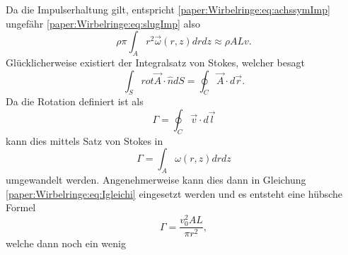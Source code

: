 Da die Impulserhaltung gilt, entspricht \ref{paper:Wirbelringe:eq:achssymImp} ungefähr \ref{paper:Wirbelringe:eq:slugImp} also
\begin{equation}
    \rho\pi\int_{A}r^2\vec{\omega}(r,z)drdz
    \approx
    \rho ALv
    \label{paper:Wirbelringe:eq:Igleichi}.
\end{equation}
Glücklicherweise existiert der Integralsatz von Stokes, welcher besagt
\begin{equation*}
    \int_{S}rot\vec{A}\cdot\hat{n}dS 
    =
    \oint_{C}\vec{A}\cdot d\vec{r}.
\end{equation*}
Da die Rotation definiert ist als 
\begin{equation*}
    \Gamma
    =
    \oint_{C}\vec{v}\cdot d\vec{l}
\end{equation*}
kann dies mittels Satz von Stokes in
\begin{equation*}
    \Gamma
    =
    \int_{A}\omega(r,z)drdz
\end{equation*}
umgewandelt werden.
Angenehmerweise kann dies dann in Gleichung \ref{paper:Wirbelringe:eq:Igleichi} eingesetzt werden und es entsteht eine hübsche Formel
\begin{equation*}
    \Gamma
    =
    \frac{v_0^2AL}{\pi r^2},
\end{equation*}
welche dann noch ein wenig